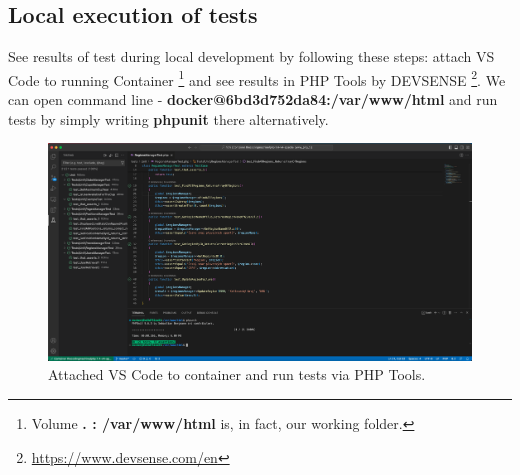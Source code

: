 \subsection{Local execution of tests}
See results of test during local development by following these steps: attach VS Code to running Container \footnote{Volume \textbf{. : /var/www/html} is, in fact, our working folder.} and see results in PHP Tools by DEVSENSE \footnote{\url{https://www.devsense.com/en}}. We can open command line - \textbf{docker@6bd3d752da84:/var/www/html} and run tests by simply writing \textbf{phpunit} there alternatively. 
\begin{figure}[h]	
    \centering	
    \includegraphics[scale=0.207]{img/phpunit_locally.png}
    \caption{Attached VS Code to container and run tests via PHP Tools.}
    \label{fig4.3:phpunitlocally}
\end{figure}
\newpage
